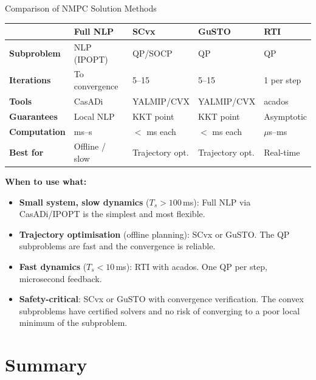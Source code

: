 \begin{summarybox}{Comparison of NMPC Solution Methods}
	\begin{center}
		\renewcommand{\arraystretch}{1.3}
		\begin{tabular}{p{} p{} p{} p{} p{}}
			\toprule
			& \textbf{Full NLP} & \textbf{SCvx} & \textbf{GuSTO} & \textbf{RTI} \\
			\midrule
			\textbf{Subproblem} & NLP (IPOPT) & QP/SOCP & QP & QP \\
			\textbf{Iterations} & To convergence & 5--15 & 5--15 & 1 per step \\
			\textbf{Tools} & CasADi & YALMIP/CVX & YALMIP/CVX & acados \\
			\textbf{Guarantees} & Local NLP & KKT point & KKT point & Asymptotic \\
			\textbf{Computation} & ms--s & $<$ ms each & $<$ ms each & $\mu$s--ms \\
			\textbf{Best for} & Offline / slow & Trajectory opt. & Trajectory opt. & Real-time \\
			\bottomrule
		\end{tabular}
	\end{center}
\end{summarybox}

\textbf{When to use what:}
\begin{itemize}[nosep]
	\item \textbf{Small system, slow dynamics} ($T_s > 100$\,ms): Full NLP via CasADi/IPOPT is the simplest and most flexible.
	\item \textbf{Trajectory optimisation} (offline planning): SCvx or GuSTO. The QP subproblems are fast and the convergence is reliable.
	\item \textbf{Fast dynamics} ($T_s < 10$\,ms): RTI with acados. One QP per step, microsecond feedback.
	\item \textbf{Safety-critical}: SCvx or GuSTO with convergence verification. The convex subproblems have certified solvers and no risk of converging to a poor local minimum of the subproblem.
\end{itemize}


\section*{Summary}

